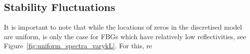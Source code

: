 %
%
\subsection{Stability Fluctuations}
\label{subsec:lichaos_skenderas}
%
%
It is important to note that while the locations of zeros in the discretised model are uniform, is only the case for FBGs which have relatively low reflectivities, see Figure~\ref{fig:uniform_spectra_varykL}. For this, re
%

